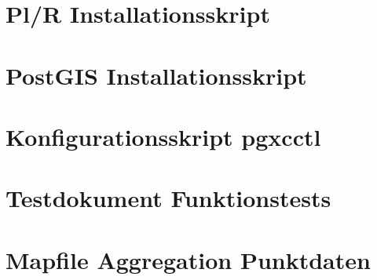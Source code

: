 \section{Pl/R Installationsskript}

\section{PostGIS Installationsskript}

\section{Konfigurationsskript pgxcctl}

\section{Testdokument Funktionstests}

\section{Mapfile Aggregation Punktdaten}

												

\pagestyle{empty}


